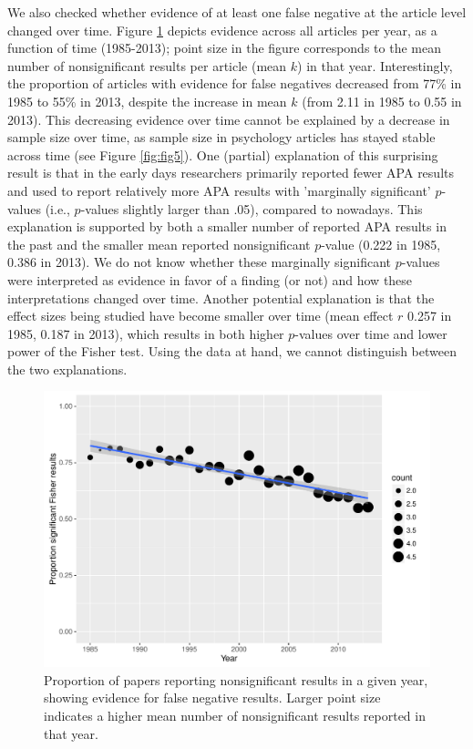 \documentclass{article}
\begin{document}
We also checked whether evidence of at least one false negative at the article level changed over time. Figure \ref{fig:fig4} depicts evidence across all articles per year, as a function of time (1985-2013); point size in the figure corresponds to the mean number of nonsignificant results per article (mean $k$) in that year. Interestingly, the proportion of articles with evidence for false negatives decreased from 77\% in 1985 to 55\% in 2013, despite the increase in mean $k$ (from 2.11 in 1985 to 0.55 in 2013). This decreasing evidence over time cannot be explained by a decrease in sample size over time, as sample size in psychology articles has stayed stable across time (see Figure \ref{fig:fig5}). One (partial) explanation of this surprising result is that in the early days researchers primarily reported fewer APA results and used to report relatively more APA results with 'marginally significant' $p$-values (i.e., $p$-values slightly larger than .05), compared to nowadays. This explanation is supported by both a smaller number of reported APA results in the past and the smaller mean reported nonsignificant $p$-value (0.222 in 1985, 0.386 in 2013). We do not know whether these marginally significant $p$-values were interpreted as evidence in favor of a finding (or not) and how these interpretations changed over time. Another potential explanation is that the effect sizes being studied have become smaller over time (mean effect $r$ 0.257 in 1985, 0.187 in 2013), which results in both higher $p$-values over time and lower power of the Fisher test. Using the data at hand, we cannot distinguish between the two explanations.

\begin{figure}
\begin{center}
\includegraphics{../figures/Fig4.pdf}
\end{center}
\caption{Proportion of papers reporting nonsignificant results in a given year, showing evidence for false negative results. Larger point size indicates a higher mean number of nonsignificant results reported in that year.}
\label{fig:fig4}
\end{figure}
\end{document}
